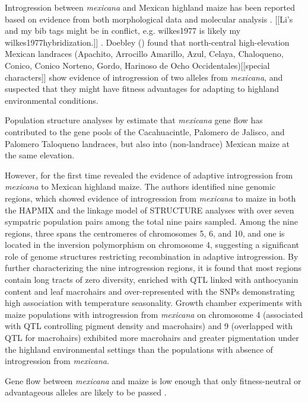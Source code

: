 \documentclass[11pt]{article}
\begin{document}
Introgression between \emph{mexicana} and Mexican highland maize has been reported based on evidence from both morphological data \cite{wilkes1977, lauter2004, doebley1984} and molecular analysis \cite{matsuoka2002, vanHeerwaarden2011, doebley1987, warburton2011, fukunaga2005}. [[Li's and my bib tags might be in conflict, e.g. wilkes1977 is likely my wilkes1977hybridization.]]
.
 Doebley (\cite{doebley1987patterns}) found that north-central high-elevation Mexican landraces (Apachito, Arrocillo Amarillo, Azul, Celaya, Chaloqueno, Conico, Conico Norteno, Gordo, Harinoso de Ocho Occidentales)[[special characters]] show evidence of introgression of two alleles from \emph{mexicana}, and suspected that they might have fitness advantages for adapting to highland environmental conditions.

Population structure analyses by \cite{matsuoka2002single} estimate that \emph{mexicana} gene flow has contributed to the gene pools of the Cacahuacintle, Palomero de Jalisco, and Palomero Taloqueno landraces, but also into (non-landrace) Mexican maize at the same elevation.

However, \cite{hufford2013} for the first time revealed the evidence of adaptive introgression from \emph{mexicana} to Mexican highland maize.
The authors identified nine genomic regions, which showed evidence of introgression from \emph{mexicana} to maize in both the HAPMIX and the linkage model of STRUCTURE analyses with over seven sympatric population pairs among the total nine pairs sampled. 
Among the nine regions, three spans the centromeres of chromosomes 5, 6, and 10, and one is located in the inversion polymorphism on chromosome 4, suggesting a significant role of genome structures restricting recombination in adaptive introgression.
By further characterizing the nine introgression regions, it is found that most regions contain long tracts of zero diversity, enriched with QTL linked with anthocyanin content and leaf macrohairs \cite{lauter2004} and over-represented with the SNPs demonstrating high association with temperature seasonality.
Growth chamber experiments with maize populations with introgression from \emph{mexicana} on chromosome 4 (associated with QTL controlling pigment density and macrohairs) and 9 (overlapped with QTL for macrohairs) exhibited more macrohairs and greater pigmentation under the highland environmental settings than the populations with absence of introgression from \emph{mexicana}.

Gene flow between \emph{mexicana} and maize is low enough that only fitness-neutral or advantageous alleles are likely to be passed \cite{slatkin1987gene}.
\end{document}
